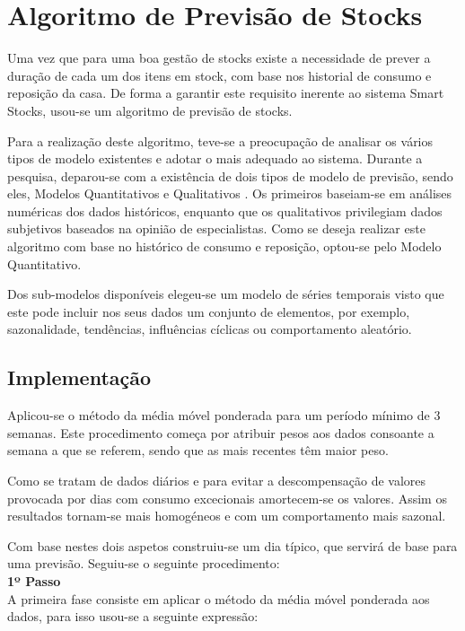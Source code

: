 \section{Algoritmo de Previsão de Stocks}\label{sec34}

Uma vez que para uma boa gestão de stocks existe a necessidade de prever a duração de cada um dos itens em stock, com base nos historial de consumo e reposição da casa. De forma a garantir este requisito inerente ao sistema Smart Stocks, usou-se um algoritmo de previsão de stocks.

Para a realização deste algoritmo, teve-se a preocupação de analisar os vários tipos de modelo existentes e adotar o mais adequado ao sistema. Durante a pesquisa, deparou-se com a existência de dois tipos de modelo de previsão, sendo eles, Modelos Quantitativos e Qualitativos \cite{GestaoStocks:MetodosPrevisaoStocks}. Os primeiros baseiam-se em análises numéricas dos dados históricos, enquanto que os qualitativos privilegiam dados subjetivos baseados na opinião de especialistas. Como se deseja realizar este algoritmo com base no histórico de consumo e reposição, optou-se pelo Modelo Quantitativo. 

Dos sub-modelos disponíveis elegeu-se um modelo de séries temporais visto que este pode incluir nos seus dados um conjunto de elementos, por exemplo, sazonalidade, tendências, influências cíclicas ou comportamento aleatório.


%
%
\subsection{Implementação}\label{subsec341}

Aplicou-se o método da média móvel ponderada para um período mínimo de 3 semanas. Este procedimento começa por atribuir pesos aos dados consoante a semana a que se referem, sendo que as mais recentes têm maior peso.

Como se tratam de dados diários e para evitar a descompensação de valores provocada por dias com consumo excecionais amortecem-se  os valores. Assim os resultados tornam-se mais homogéneos e com um comportamento mais sazonal.   

Com base nestes dois aspetos construiu-se um dia típico, que servirá de base para uma previsão. Seguiu-se o seguinte procedimento:\\

\textbf{1º Passo}\\
A primeira fase consiste em aplicar o método da média móvel ponderada aos dados, para isso usou-se a seguinte expressão:

